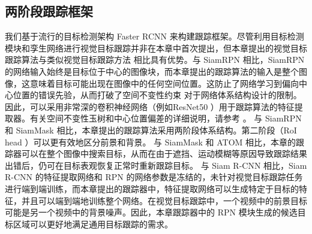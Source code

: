 \subsection{两阶段跟踪框架}

我们基于流行的目标检测架构 Faster RCNN \cite{ren2015faster} 来构建跟踪框架。尽管利用目标检测模块和孪生网络进行视觉目标跟踪并非在本章中首次提出，但本章提出的视觉目标跟踪算法与类似视觉目标跟踪方法 \cite{SiamRPN, Wang2018SiamMask, danelljan2019atom, voigtlaender2019siam} 相比具有优势。与 SiamRPN \cite{SiamRPN}相比，SiamRPN 的网络输入始终是目标位于中心的图像块，而本章提出的跟踪算法的输入是整个图像，这意味着目标可能出现在图像中的任何空间位置。这防止了网络学习到偏向中心位置的错误先验，从而打破了空间不变性约束 \cite{SiamRPN++} 对于网络体系结构设计的限制。因此，可以采用非常深的卷积神经网络（例如ResNet50 \cite{he2016deep}）用于跟踪算法的特征提取器。有关空间不变性玉树和中心位置偏差的详细说明，请参考 \cite{SiamRPN++}。
与 SiamRPN \cite{SiamRPN} 和 SiamMask \cite{Wang2018SiamMask} 相比，本章提出的跟踪算法采用两阶段体系结构。第二阶段（RoI head \cite{ren2015faster}）可以更有效地区分前景和背景。
与 SiamMask \cite{Wang2018SiamMask} 和 ATOM \cite{danelljan2019atom} 相比，本章的跟踪器可以在整个图像中搜索目标，从而在由于遮挡、运动模糊等原因导致跟踪结果出错后，仍可在目标表观恢复正常时重新跟踪目标。
与 Siam R-CNN \cite{voigtlaender2019siam} 相比，Siam R-CNN 的特征提取网络和 RPN 的网络参数是冻结的，未针对视觉目标跟踪任务进行端到端训练，而本章提出的跟踪器中，特征提取网络可以生成特定于目标的特征，并且可以端到端地训练整个网络。在视觉目标跟踪中，一个视频中的前景目标可能是另一个视频中的背景噪声。因此，本章跟踪器中的 RPN 模块生成的候选目标区域可以更好地满足通用目标跟踪的需求。

